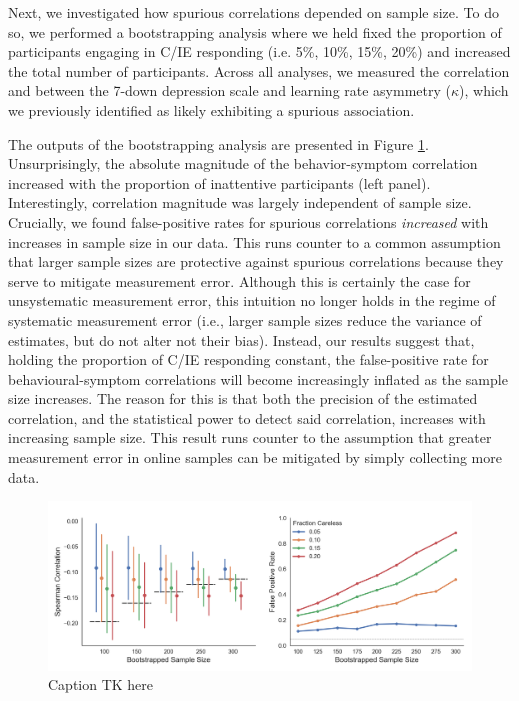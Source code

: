 \documentclass[a4paper,notitlepage,12pt]{article}
\begin{document}
Next, we investigated how spurious correlations depended on sample size. To do so, we performed a bootstrapping analysis where we held fixed the proportion of participants engaging in C/IE responding (i.e. 5\%, 10\%, 15\%, 20\%) and increased the total number of participants. Across all analyses, we measured the correlation and between the 7-down depression scale and learning rate asymmetry ($\kappa$), which we previously identified as likely exhibiting a spurious association. 

The outputs of the bootstrapping analysis are presented in Figure \ref{fig:bootstrap}. Unsurprisingly, the absolute magnitude of the behavior-symptom correlation increased with the proportion of inattentive participants (left panel). Interestingly, correlation magnitude was largely independent of sample size. Crucially, we found false-positive rates for spurious correlations \emph{increased} with increases in sample size in our data. This runs counter to a common assumption that larger sample sizes are protective against spurious correlations because they serve to mitigate measurement error. Although this is certainly the case for unsystematic measurement error, this intuition no longer holds in the regime of systematic measurement error (i.e., larger sample sizes reduce the variance of estimates, but do not alter not their bias). Instead, our results suggest that, holding the proportion of C/IE responding constant, the false-positive rate for behavioural-symptom correlations will become increasingly inflated as the sample size increases. The reason for this is that both the precision of the estimated correlation, and the statistical power to detect said correlation, increases with increasing sample size. This result runs counter to the assumption that greater measurement error in online samples can be mitigated by simply collecting more data. 

\begin{figure}[!t]
\includegraphics[width=16cm]{../figures/main_03b.png}
\centering
\caption{Caption TK here}
\label{fig:bootstrap}
\end{figure}
\end{document}
